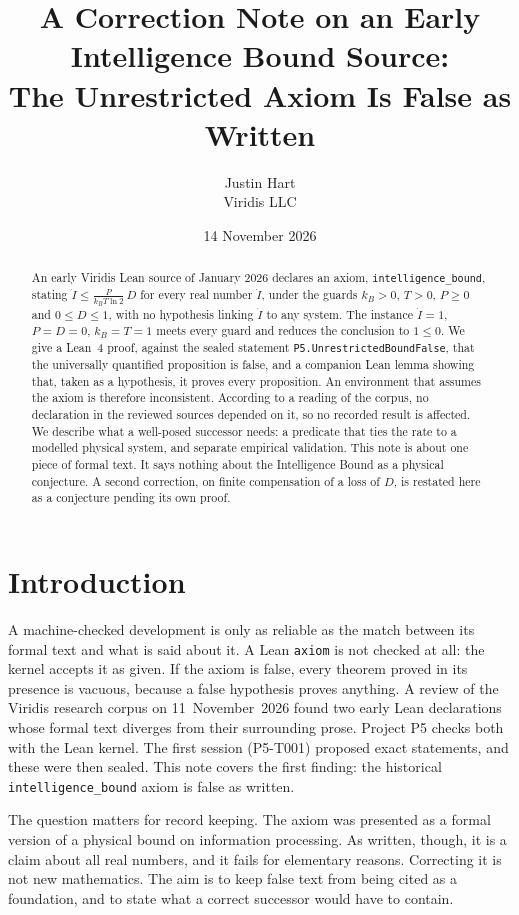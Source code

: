 \documentclass[11pt]{article}
\title{A Correction Note on an Early Intelligence Bound Source:\\
The Unrestricted Axiom Is False as Written}
\author{Justin Hart\\Viridis LLC}
\date{14 November 2026}
\theoremstyle{remark}
\begin{document}
\maketitle

\begin{abstract}
An early Viridis Lean source of January 2026 declares an axiom, \texttt{intelligence\_bound},
stating $\dot I\le \frac{P}{k_B T\ln 2}\,D$ for every real number $\dot I$, under the guards
$k_B>0$, $T>0$, $P\ge0$ and $0\le D\le1$, with no hypothesis linking $\dot I$ to any system.
The instance $\dot I=1$, $P=D=0$, $k_B=T=1$ meets every guard and reduces the conclusion to
$1\le0$. We give a Lean~4 proof, against the sealed statement
\texttt{P5.UnrestrictedBoundFalse}, that the universally quantified proposition is false, and a
companion Lean lemma showing that, taken as a hypothesis, it proves every proposition. An
environment that assumes the axiom is therefore inconsistent. According to a reading of the
corpus, no declaration in the reviewed sources depended on it, so no recorded result is affected.
We describe what a well-posed successor needs: a predicate that ties the rate to a modelled
physical system, and separate empirical validation. This note is about one piece of formal
text. It says nothing about the Intelligence Bound as a physical conjecture. A second correction,
on finite compensation of a loss of $D$, is restated here as a conjecture pending its own proof.
\end{abstract}

\section{Introduction}
A machine-checked development is only as reliable as the match between its formal text and what
is said about it. A Lean \texttt{axiom} is not checked at all: the kernel accepts it as given. If
the axiom is false, every theorem proved in its presence is vacuous, because a false hypothesis
proves anything. A review of the Viridis research corpus on 11~November~2026 found two early Lean
declarations whose formal text diverges from their surrounding prose. Project P5 checks both with
the Lean kernel. The first session (P5-T001) proposed exact statements, and these were then sealed.
This note covers the first finding: the historical \texttt{intelligence\_bound} axiom is false
as written.

The question matters for record keeping. The axiom was presented as a formal version of a
physical bound on information processing. As written, though, it is a claim about all real
numbers, and it fails for elementary reasons. Correcting it is not new mathematics. The aim is to
keep false text from being cited as a foundation, and to state what a correct successor would
have to contain.
\end{document}
